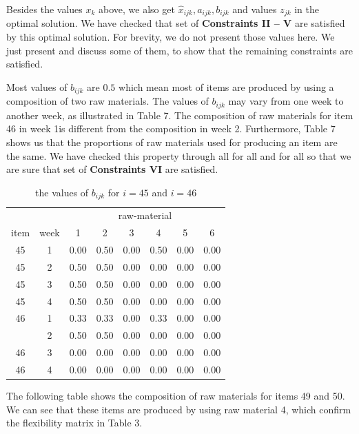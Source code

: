 \documentclass[preprint, 3p,
authoryear]{elsarticle} %
\begin{document}
Besides the values \(x_k\) above, we also get
\(\hat{x}_{ijk}, a_{ijk}, b_{ijk}\) and values \(z_{jk}\) in the optimal
solution. We have checked that set of \textbf{Constraints II -- V} are
satisfied by this optimal solution. For brevity, we do not present those
values here. We just present and discuss some of them, to show that the
remaining constraints are satisfied.

Most values of \(b_{ijk}\) are \(0.5\) which mean most of items are
produced by using a composition of two raw materials. The values of
\(b_{ijk}\) may vary from one week to another week, as illustrated in
Table 7. The composition of raw materials for item 46 in week 1is
different from the composition in week 2. Furthermore, Table 7 shows us
that the proportions of raw materials used for producing an item are the
same. We have checked this property through all for all and for all so
that we are sure that set of \textbf{Constraints VI} are satisfied.

\begin{table}[!h]

\caption{\label{tab:unnamed-chunk-10}the values of $b_{ijk}$ for $i = 45$ and $i = 46$}
\centering
\begin{tabular}[t]{cccccccc}
\toprule
\multicolumn{2}{c}{ } & \multicolumn{6}{c}{raw-material} \\
\cmidrule(l{3pt}r{3pt}){3-8}
item & week & 1 & 2 & 3 & 4 & 5 & 6\\
\midrule
45 & 1 & 0.00 & 0.50 & 0.00 & 0.50 & 0.00 & 0.00\\
45 & 2 & 0.50 & 0.50 & 0.00 & 0.00 & 0.00 & 0.00\\
45 & 3 & 0.50 & 0.50 & 0.00 & 0.00 & 0.00 & 0.00\\
45 & 4 & 0.50 & 0.50 & 0.00 & 0.00 & 0.00 & 0.00\\
46 & 1 & 0.33 & 0.33 & 0.00 & 0.33 & 0.00 & 0.00\\
\addlinespace
46 & 2 & 0.50 & 0.50 & 0.00 & 0.00 & 0.00 & 0.00\\
46 & 3 & 0.00 & 0.00 & 0.00 & 0.00 & 0.00 & 0.00\\
46 & 4 & 0.00 & 0.00 & 0.00 & 0.00 & 0.00 & 0.00\\
\bottomrule
\end{tabular}
\end{table}

The following table shows the composition of raw materials for items 49
and 50. We can see that these items are produced by using raw material
4, which confirm the flexibility matrix in Table 3.
\end{document}
